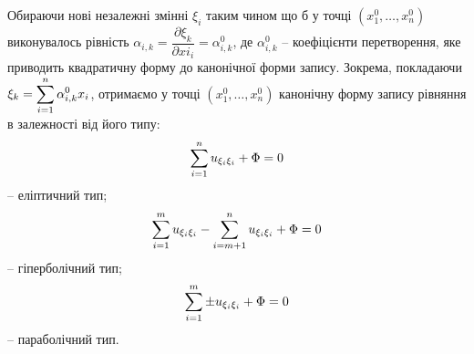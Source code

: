 Обираючи нові незалежні змінні $\xi_i$ таким чином що б у точці $(x_1^0,\ldots,x_n^0)$ виконувалось рівність $\alpha_{i,k}=\dfrac{\partial \xi_k}{\partial xi_i} = \alpha_{i,k}^0$, де $\alpha_{i,k}^0$ -- коефіцієнти перетворення, яке приводить квадратичну форму до канонічної форми запису. Зокрема, покладаючи $\xi_k = \displaystyle\sum\limits_{i=1}^n \alpha_{i,k}^0 x_i$, отримаємо у точці $(x_1^0,\ldots,x_n^0)$ канонічну форму запису рівняння в залежності від його типу:
\begin{equation}
	\label{eq:7.18}
	\displaystyle\sum\limits_{i=1}^n u_{\xi_i\xi_i} + \Phi = 0
\end{equation} -- еліптичний тип;
\begin{equation}
	\label{eq:7.19}
	\displaystyle\sum\limits_{i=1}^m u_{\xi_i\xi_i} - \displaystyle\sum\limits_{i=m+1}^n u_{\xi_i\xi_i} + \Phi = 0
\end{equation} -- гіперболічний тип;
\begin{equation}
	\label{eq7.20}
	\displaystyle\sum\limits_{i=1}^m \pm u_{\xi_i\xi_i} + \Phi = 0
\end{equation} -- параболічний тип.
